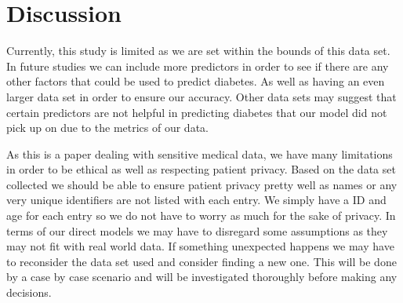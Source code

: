 \documentclass[12pt]{article}
\begin{document}
\section{Discussion}
\label{sec:disc}

Currently, this study is limited as we are set within the bounds of this data set. In future studies we can include more predictors in 
order to see if there are any other factors that could be used to predict diabetes. As well as having an even larger data set in order to 
ensure our accuracy. Other data sets may suggest that certain predictors are not helpful in predicting diabetes that our model did not pick 
up on due to the metrics of our data. 


As this is a paper dealing with sensitive medical data, we have many limitations in order to be ethical as well as respecting patient 
privacy. Based on the data set collected we should be able to ensure patient privacy pretty well as names or any very unique identifiers 
are not listed with each entry. We simply have a ID and age for each entry so we do not have to worry as much for the sake of privacy. In 
terms of our direct models we may have to disregard some assumptions as they may not fit with real world data. If something unexpected 
happens we may have to reconsider the data set used and consider finding a new one. This will be done by a case by case scenario and will 
be investigated thoroughly before making any decisions.



\end{document}
